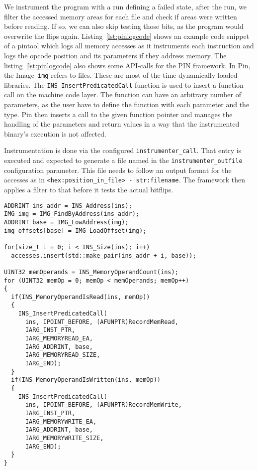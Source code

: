 We instrument the program with a run defining a failed state, after the run, we
filter the accessed memory areas for each file and check if areas were written
before reading. If so, we can also skip testing those bits, as the program would
overwrite the flips again. Listing~\ref{lst:pinlogcode} shows an example code
snippet of a pintool which logs all memory accesses as it instruments each
instruction and logs the opcode position and its parameters if they address
memory. The listing~\ref{lst:pinlogcode} also shows some API-calls for the PIN
framework. In Pin, the Image~\texttt{img} refers to files. These are most of the
time dynamically loaded libraries. The \texttt{INS\_InsertPredicatedCall}
function is used to insert a function call on the machine code layer. The
function can have an arbitrary number of parameters, as the user have to define
the function with each parameter and the type. Pin then inserts a call to the
given function pointer and manages the handling of the parameters and return
values in a way that the instrumented binary's execution is not affected.

Instrumentation is done via the configured \texttt{instrumenter\_call}. That
entry is executed and expected to generate a file named in the
\texttt{instrumenter\_outfile} configuration parameter. This file needs to
follow an output format for the accesses as in \texttt{<hex:position\_in\_file>
- str:filename}. The framework then applies a filter to that before it tests the
actual bitflips.

\begin{minipage}{\linewidth}
\begin{lstlisting}[style=CStyle,
                   caption={Example C++ code for a pintool logging memory
accesses. At first, the tool stores the instruction bytes, and after the
operands are stored separately, depending on if they are writing or reading
memory.},
                   label={lst:pinlogcode}]
ADDRINT ins_addr = INS_Address(ins);
IMG img = IMG_FindByAddress(ins_addr);
ADDRINT base = IMG_LowAddress(img);
img_offsets[base] = IMG_LoadOffset(img);

for(size_t i = 0; i < INS_Size(ins); i++)
  accesses.insert(std::make_pair(ins_addr + i, base));

UINT32 memOperands = INS_MemoryOperandCount(ins);
for (UINT32 memOp = 0; memOp < memOperands; memOp++)
{
  if(INS_MemoryOperandIsRead(ins, memOp))
  {
    INS_InsertPredicatedCall(
      ins, IPOINT_BEFORE, (AFUNPTR)RecordMemRead,
      IARG_INST_PTR,
      IARG_MEMORYREAD_EA,
      IARG_ADDRINT, base,
      IARG_MEMORYREAD_SIZE,
      IARG_END);
  }
  if(INS_MemoryOperandIsWritten(ins, memOp))
  {
    INS_InsertPredicatedCall(
      ins, IPOINT_BEFORE, (AFUNPTR)RecordMemWrite,
      IARG_INST_PTR,
      IARG_MEMORYWRITE_EA,
      IARG_ADDRINT, base,
      IARG_MEMORYWRITE_SIZE,
      IARG_END);
  }
}
\end{lstlisting}
\end{minipage}

